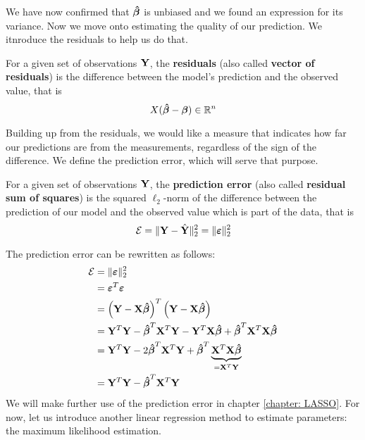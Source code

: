 We have now confirmed that \( \boldsymbol{\hat{\beta}} \) is unbiased and we found an expression for its variance. Now we move onto estimating the quality of our prediction. We itnroduce the residuals to help us do that.
\begin{definition}[Residuals]
    For a given set of observations \(\mathbf{Y}\), the \textbf{residuals} (also called \textbf{vector of residuals}) is the difference between the model's prediction and the observed value, that is
    \[
        X (\boldsymbol{\hat{\beta}} - \boldsymbol{\beta}) \in \mathbb{R}^n
    \]
\end{definition}
Building up from the residuals, we would like a measure that indicates how far our predictions are from the measurements, regardless of the sign of the difference. We define the prediction error, which will serve that purpose.
\begin{definition}
    For a given set of observations \(\mathbf{Y}\), the \textbf{prediction error} (also called \textbf{residual sum of squares}) is the squared \(\ell_2\)-norm of the difference between the prediction of our model and the observed value which is part of the data, that is
    \[
        \mathcal{E} = \| \mathbf{Y} - \hat{\mathbf{Y}} \|_2^2 = \| \boldsymbol{\varepsilon} \|_2^2
    \]
\end{definition}
The prediction error can be rewritten as follows:
\begin{align*}
    \mathcal{E}
     & = \| \boldsymbol{\varepsilon} \|_2^2                                                                     \\
     & = \boldsymbol{\varepsilon}^T \boldsymbol{\varepsilon}                                                                        \\
     & = \left( \mathbf{Y} - \mathbf{X} \boldsymbol{\hat{\beta}} \right)^T \left(\mathbf{Y} - \mathbf{X} \boldsymbol{\hat{\beta}}  \right)                    \\
     & = \mathbf{Y}^T \mathbf{Y} - \boldsymbol{\hat{\beta}}^T \mathbf{X}^T \mathbf{Y} - \mathbf{Y}^T \mathbf{X} \boldsymbol{\hat{\beta}} + \boldsymbol{\hat{\beta}}^T \mathbf{X}^T \mathbf{X} \boldsymbol{\hat{\beta}}          \\
     & = \mathbf{Y}^T \mathbf{Y} - 2 \boldsymbol{\hat{\beta}}^T \mathbf{X}^T \mathbf{Y} + \boldsymbol{\hat{\beta}}^T \underbrace{\mathbf{X}^T \mathbf{X} \boldsymbol{\hat{\beta}}}_{= \mathbf{X}^T \mathbf{Y}} \\
     & = \mathbf{Y}^T \mathbf{Y} - \boldsymbol{\hat{\beta}}^T \mathbf{X}^T \mathbf{Y}                                                        \\
\end{align*}
We will make further use of the prediction error in chapter \ref{chapter: LASSO}. For now, let us introduce another linear regression method to estimate parameters: the maximum likelihood estimation.

